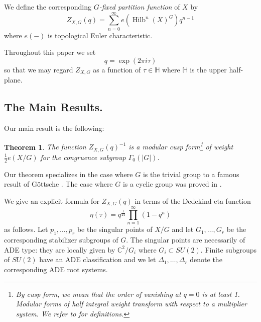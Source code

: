 \documentclass{amsart}
\newtheorem{theorem}{Theorem}[section]
\theoremstyle{definition}
\newcommand{\half}{\frac{1}{2}}
\newcommand{\CC} {{\mathbb C}}          %
\newcommand{\HH}{\mathbb{H}}
\newcommand{\Hilb}{\operatorname{Hilb}}
\begin{document}
We define the corresponding \emph{$G$-fixed partition function} of
$X$ by
\[
Z_{X,G}(q) = \sum_{n=0}^{\infty} e\left(\Hilb^{n}(X)^{G} \right) q^{n-1} 
\]
where $e(-)$ is topological Euler characteristic.

Throughout this paper we set
\[
q=\exp\left(2\pi i \tau  \right)
\]
so that we may regard $Z_{X,G}$ as a function of $\tau \in \HH$ where
$\HH$ is the upper half-plane.

\subsection{The Main Results.}
Our main result is the following:

\begin{theorem}
\label{thm:main} The function $Z_{X,G}(q)^{-1}$ is a modular cusp
form\footnote{By cusp form, we mean that the order of vanishing at
$q=0$ is at least 1. Modular forms of half integral weight transform with
respect to a multiplier system. We refer to \cite{kohler2011eta} for
definitions.} of weight $\half e(X/G)$ for the congruence subgroup
$\Gamma_{0}(|G|)$.
\end{theorem}
   

Our theorem specializes in the case where $G$ is the trivial group to
a famous result of G\"ottsche \cite{gottsche1990betti}. The case where
$G$ is a cyclic group was proved in \cite{bryan2018chl}.


We give an explicit formula for $Z_{X,G}(q)$ in terms of the
Dedekind eta function
\[
\eta (\tau ) = q^{\frac{1}{24}}\prod_{n=1}^{\infty} (1-q^{n})
\]
as follows. Let $p_{1},\dots ,p_{r}$ be the singular points of $X/G$
and let $G_{1},\dots ,G_{r}$ be the corresponding stabilizer subgroups
of $G$. The singular points are necessarily of ADE type: they are
locally given by $\CC^{2}/G_{i}$ where $G_{i}\subset SU(2)$. Finite
subgroups of $SU(2)$ have an ADE classification and we let
$\Delta_{1},\dots ,\Delta_{r}$ denote the corresponding ADE root
systems.
\end{document}
